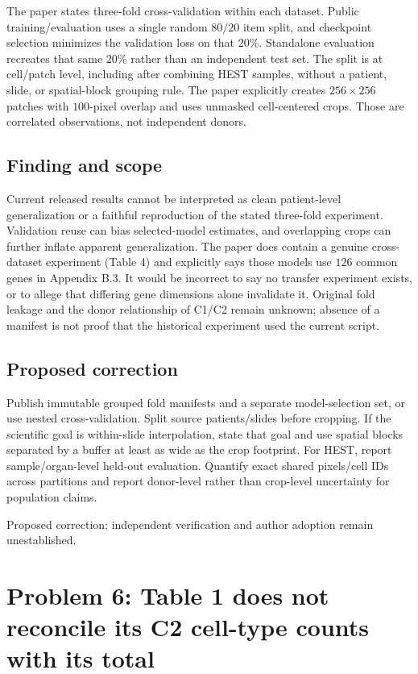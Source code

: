 \documentclass[11pt]{article}
\begin{document}
The paper states three-fold cross-validation within each dataset. Public training/evaluation uses a single random \(80/20\) item split, and checkpoint selection minimizes the validation loss on that \(20\)\%. Standalone evaluation recreates that same \(20\%\) rather than an independent test set. The split is at cell/patch level, including after combining HEST samples, without a patient, slide, or spatial-block grouping rule. The paper explicitly creates \(256\times256\) patches with \(100\)-pixel overlap and uses unmasked cell-centered crops. Those are correlated observations, not independent donors.

\subsection*{Finding and scope}

Current released results cannot be interpreted as clean patient-level generalization or a faithful reproduction of the stated three-fold experiment. Validation reuse can bias selected-model estimates, and overlapping crops can further inflate apparent generalization. The paper does contain a genuine cross-dataset experiment (Table 4) and explicitly says those models use \(126\) common genes in Appendix B.3. It would be incorrect to say no transfer experiment exists, or to allege that differing gene dimensions alone invalidate it. Original fold leakage and the donor relationship of C1/C2 remain unknown; absence of a manifest is not proof that the historical experiment used the current script.

\subsection*{Proposed correction}

Publish immutable grouped fold manifests and a separate model-selection set, or use nested cross-validation. Split source patients/slides before cropping. If the scientific goal is within-slide interpolation, state that goal and use spatial blocks separated by a buffer at least as wide as the crop footprint. For HEST, report sample/organ-level held-out evaluation. Quantify exact shared pixels/cell IDs across partitions and report donor-level rather than crop-level uncertainty for population claims.

Proposed correction; independent verification and author adoption remain unestablished.

\section*{Problem 6: Table 1 does not reconcile its C2 cell-type counts with its total}
\end{document}
